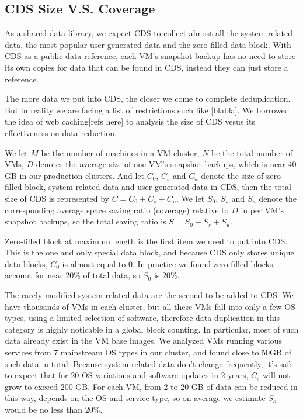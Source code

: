 \subsection{CDS Size V.S. Coverage}
As a shared data library, we expect CDS to collect almost all the system related data, the most popular user-generated data and the zero-filled data block.
With CDS as a public data reference, each VM's snapshot backup has no need to store its own copies for data that can be found in CDS, instead they can just
store a reference.

The more data we put into CDS, the closer we come to complete deduplication. But in reality we are facing a list of restrictions such like [blabla].
We borrowed the idea of web caching[refs here] to analysis the size of CDS vesus its effectiveness on data reduction.

We let $M$ be the number of machines in a VM cluster, $N$ be the total number of VMs,
$D$ denotes the average size of one VM's snapshot backups, which is near 40 GB in our production clusters.
And let $C_0$, $C_s$ and $C_u$ denote the size of zero-filled block, system-related data and user-generated data in CDS,
then the total size of CDS is represented by $C=C_0+C_s+C_u$.
We let $S_0$, $S_s$ and $S_u$ denote the corresponding average space saving ratio (coverage) relative to $D$ in per VM's snapshot backups,
so the total saving ratio is $S=S_0+S_s+S_u$.

Zero-filled block at maximum length is the first item we need to put into CDS. This is the one and only special data block, 
and because CDS only stores unique data blocks, $C_0$ is almost equal to 0. In practice we found zero-filled blocks account
for near 20\% of total data, so $S_0$ is 20\%.

The rarely modified system-related data are the second to be added to CDS. We have thousands of VMs in each cluster, 
but all these VMs fall into only a few OS types, using a limited selection of software, therefore data duplication in this category
is highly noticable in a global block counting. In particular, most of such data already exist in the VM base images. 
We analyzed VMs running various services from 7 mainstream OS types in our cluster, and found close to 50GB of such data in total. 
Because system-related data don't change frequently, it's safe to expect that for 20 OS variations 
and software updates in 2 years, $C_s$ will not grow to exceed 200 GB.
For each VM, from 2 to 20 GB of data can be reduced in this way, depends on the OS and service type, so on average we estimate
$S_s$ would be no less than 20\%.

